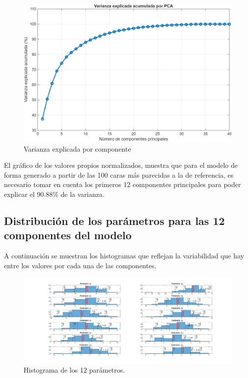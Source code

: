 \documentclass[11pt, letterpaper]{article}
\begin{document}
\begin{figure}[h!]
	\centering
	\begin{minipage}{1\textwidth}
		\centering
		\includegraphics[width=1\textwidth]{IMG/G1.png}
	\end{minipage}
	\caption{Varianza explicada por componente}
	\label{fig:f2}
\end{figure}

El gráfico de los valores propios normalizados, muestra que para el modelo de forma generado a partir de las 100 caras más parecidas a la de referencia, es necesario tomar en cuenta los primeros 12 componentes principales para poder explicar el  90.88\% de la varianza.

\newpage

\subsection{Distribución de los parámetros para las 12 componentes del modelo}

A continuación se muestran los histogramas que reflejan la variabilidad que hay entre los valores por cada una de las componentes.

\begin{figure}[h!]
	\centering %
	\includegraphics[width=1.35\textwidth]{IMG/G2.png} %
	\caption{Histograma de los 12 parámetros.}
	\label{fig:f3}
\end{figure}
\end{document}
